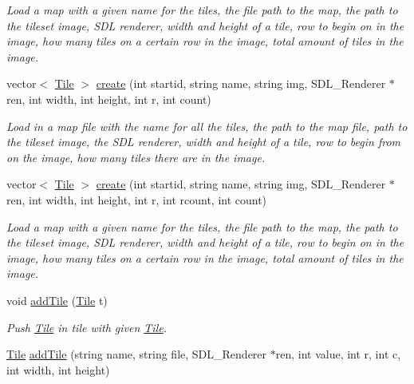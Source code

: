 \begin{DoxyCompactItemize}
\begin{DoxyCompactList}\small\item\em Load a map with a given name for the tiles, the file path to the map, the path to the tileset image, S\+DL renderer, width and height of a tile, row to begin on in the image, how many tiles on a certain row in the image, total amount of tiles in the image. \end{DoxyCompactList}\item 
vector$<$ \hyperlink{classTile}{Tile} $>$ \hyperlink{classTileset_aa9e6d07ce652af578d49d6415461d692}{create} (int startid, string name, string img, S\+D\+L\+\_\+\+Renderer $\ast$ren, int width, int height, int r, int count)\hypertarget{classTileset_aa9e6d07ce652af578d49d6415461d692}{}\label{classTileset_aa9e6d07ce652af578d49d6415461d692}

\begin{DoxyCompactList}\small\item\em Load in a map file with the name for all the tiles, the path to the map file, path to the tileset image, the S\+DL renderer, width and height of a tile, row to begin from on the image, how many tiles there are in the image. \end{DoxyCompactList}\item 
vector$<$ \hyperlink{classTile}{Tile} $>$ \hyperlink{classTileset_ae11e3dc2ff393646e68de707f47c71ea}{create} (int startid, string name, string img, S\+D\+L\+\_\+\+Renderer $\ast$ren, int width, int height, int r, int rcount, int count)\hypertarget{classTileset_ae11e3dc2ff393646e68de707f47c71ea}{}\label{classTileset_ae11e3dc2ff393646e68de707f47c71ea}

\begin{DoxyCompactList}\small\item\em Load a map with a given name for the tiles, the file path to the map, the path to the tileset image, S\+DL renderer, width and height of a tile, row to begin on in the image, how many tiles on a certain row in the image, total amount of tiles in the image. \end{DoxyCompactList}\item 
void \hyperlink{classTileset_a26acaabd06601aba2e277fdd2b750fc7}{add\+Tile} (\hyperlink{classTile}{Tile} t)\hypertarget{classTileset_a26acaabd06601aba2e277fdd2b750fc7}{}\label{classTileset_a26acaabd06601aba2e277fdd2b750fc7}

\begin{DoxyCompactList}\small\item\em Push \hyperlink{classTile}{Tile} in tile with given \hyperlink{classTile}{Tile}. \end{DoxyCompactList}\item 
\hyperlink{classTile}{Tile} \hyperlink{classTileset_aea4085286f450afdb53b22c917a77cba}{add\+Tile} (string name, string file, S\+D\+L\+\_\+\+Renderer $\ast$ren, int value, int r, int c, int width, int height)\hypertarget{classTileset_aea4085286f450afdb53b22c917a77cba}{}\label{classTileset_aea4085286f450afdb53b22c917a77cba}


\end{DoxyCompactItemize}
